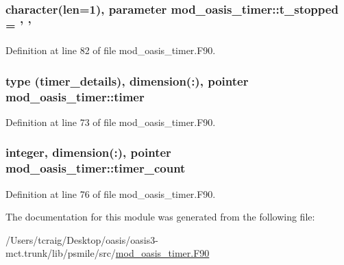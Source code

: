\hypertarget{classmod__oasis__timer_aceca66a08f073eb12f2643edc7c400fe}{
\subsubsection[{t\+\_\+stopped}]{\setlength{\rightskip}{0pt plus 5cm}character(len=1), parameter mod\+\_\+oasis\+\_\+timer\+::t\+\_\+stopped = ' '\hspace{0.3cm}{\ttfamily [private]}}}\label{classmod__oasis__timer_aceca66a08f073eb12f2643edc7c400fe}


Definition at line 82 of file mod\+\_\+oasis\+\_\+timer.\+F90.

\hypertarget{classmod__oasis__timer_a8a4b64983bdf68b795ab2112bc02b8bc}{
\subsubsection[{timer}]{\setlength{\rightskip}{0pt plus 5cm}type ({\bf timer\+\_\+details}), dimension(\+:), pointer mod\+\_\+oasis\+\_\+timer\+::timer\hspace{0.3cm}{\ttfamily [private]}}}\label{classmod__oasis__timer_a8a4b64983bdf68b795ab2112bc02b8bc}


Definition at line 73 of file mod\+\_\+oasis\+\_\+timer.\+F90.

\hypertarget{classmod__oasis__timer_a225db1b2b8bd57f0567d37b5c4d00ca3}{
\subsubsection[{timer\+\_\+count}]{\setlength{\rightskip}{0pt plus 5cm}integer, dimension(\+:), pointer mod\+\_\+oasis\+\_\+timer\+::timer\+\_\+count\hspace{0.3cm}{\ttfamily [private]}}}\label{classmod__oasis__timer_a225db1b2b8bd57f0567d37b5c4d00ca3}


Definition at line 76 of file mod\+\_\+oasis\+\_\+timer.\+F90.



The documentation for this module was generated from the following file\+:\begin{DoxyCompactItemize}
\item 
/\+Users/tcraig/\+Desktop/oasis/oasis3-\/mct.\+trunk/lib/psmile/src/\hyperlink{mod__oasis__timer_8_f90}{mod\+\_\+oasis\+\_\+timer.\+F90}\end{DoxyCompactItemize}

